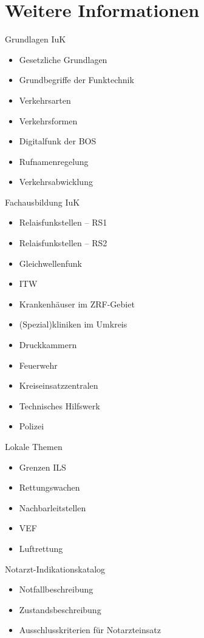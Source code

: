 \section{Weitere Informationen}
\begin{hintbox}{Grundlagen IuK}
    \begin{multicols}{2}
        \begin{itemize}
            \item Gesetzliche Grundlagen
            \item Grundbegriffe der Funktechnik
            \item Verkehrsarten
            \item Verkehrsformen
            \item Digitalfunk der BOS
            \item Rufnamenregelung
            \item Verkehrsabwicklung
        \end{itemize}
    \end{multicols}
\end{hintbox}   
\begin{hintbox}{Fachausbildung IuK}
    \begin{multicols}{2}
        \begin{itemize}
            \item Relaisfunkstellen -- RS1
            \item Relaisfunkstellen -- RS2
            \item Gleichwellenfunk
            \item ITW
            \item Krankenhäuser im ZRF-Gebiet
            \item (Spezial)kliniken im Umkreis
            \item Druckkammern
            \item Feuerwehr
            \item Kreiseinsatzzentralen
            \item Technisches Hilfswerk
            \item Polizei
        \end{itemize}
    \end{multicols}
\end{hintbox}
\begin{hintbox}{Lokale Themen}
    \begin{multicols}{2}
        \begin{itemize}
            \item Grenzen ILS
            \item Rettungswachen
            \item Nachbarleitstellen
            \item VEF
            \item Luftrettung
        \end{itemize}
    \end{multicols}
\end{hintbox}
\begin{hintbox}{Notarzt-Indikationskatalog}
    \begin{itemize}
        \item Notfallbeschreibung
        \item Zustandsbeschreibung
        \item Ausschlusskriterien für Notarzteinsatz
    \end{itemize}
\end{hintbox}